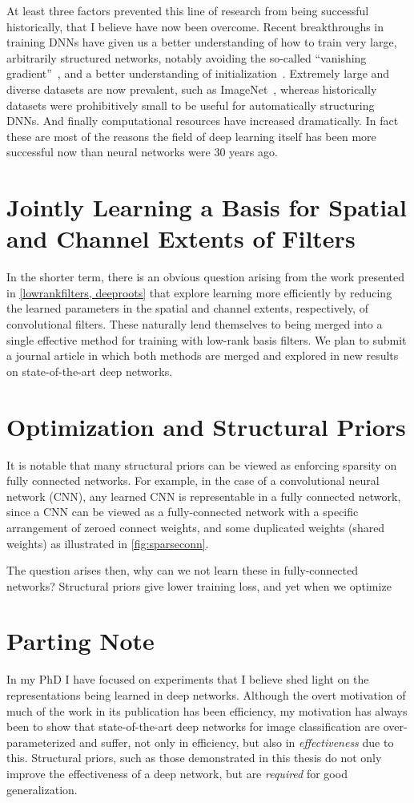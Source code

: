 \documentclass[thesis]{subfiles}
\begin{document}
At least three factors prevented this line of research from being successful historically, that I believe have now been overcome. Recent breakthroughs in training DNNs have given us a better understanding of how to train very large, arbitrarily structured networks, notably avoiding the so-called ``vanishing gradient''~\citep{Ioffe2015,He2016}, and a better understanding of initialization~\citep{He2015b}. Extremely large and diverse datasets are now prevalent, such as ImageNet~\citep{ILSVRC2015}, whereas historically datasets were prohibitively small to be useful for automatically structuring DNNs. And finally computational resources have increased dramatically. In fact these are most of the reasons the field of deep learning itself has been more successful now than neural networks were 30 years ago.

\section{Jointly Learning a Basis for Spatial and Channel Extents of Filters}
\label{journalplan}
In the shorter term, there is an obvious question arising from the work presented in \cref{lowrankfilters, deeproots} that explore learning more efficiently by reducing the learned parameters in the spatial and channel extents, respectively, of convolutional filters. These naturally lend themselves to being merged into a single effective method for training with low-rank basis filters. We plan to submit a journal article in which both methods are merged and explored in new results on state-of-the-art deep networks.

\section{Optimization and Structural Priors}
It is notable that many structural priors can be viewed as enforcing sparsity on fully connected networks. For example, in the case of a convolutional neural network (CNN), any learned CNN is representable in a fully connected network, since a CNN can be viewed as a fully-connected network with a specific arrangement of zeroed connect weights, and some duplicated weights (shared weights) as illustrated in \cref{fig:sparseconn}.

The question arises then, why can we not learn these in fully-connected networks? Structural priors give lower training loss, and yet when we optimize 
\section{Parting Note}
In my PhD I have focused on experiments that I believe shed light on the representations being learned in deep networks. Although the overt motivation of much of the work in its publication has been efficiency, my motivation has always been to show that state-of-the-art deep networks for image classification are over-parameterized and suffer, not only in efficiency, but also in \emph{effectiveness} due to this. Structural priors, such as those demonstrated in this thesis do not only improve the effectiveness of a deep network, but are \emph{required} for good generalization.
\end{document}
